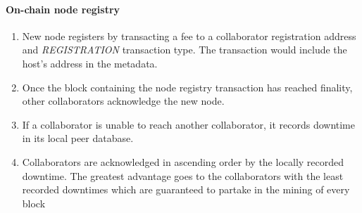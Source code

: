 \documentclass[10pt,twocolumn]{article}
\begin{document}
\paragraph{On-chain node registry}
\begin{enumerate}
\item New node registers by transacting a fee to a collaborator registration address and \textit{REGISTRATION} transaction type. The transaction would include the host's address in the metadata.
\item Once the block containing the node registry transaction has reached finality, other collaborators acknowledge the new node.
\item If a collaborator is unable to reach another collaborator, it records downtime in its local peer database.
\item Collaborators are acknowledged in ascending order by the locally recorded downtime. The greatest advantage goes to the collaborators with the least recorded downtimes which are guaranteed to partake in the mining of every block
\end{enumerate}
\end{document}
